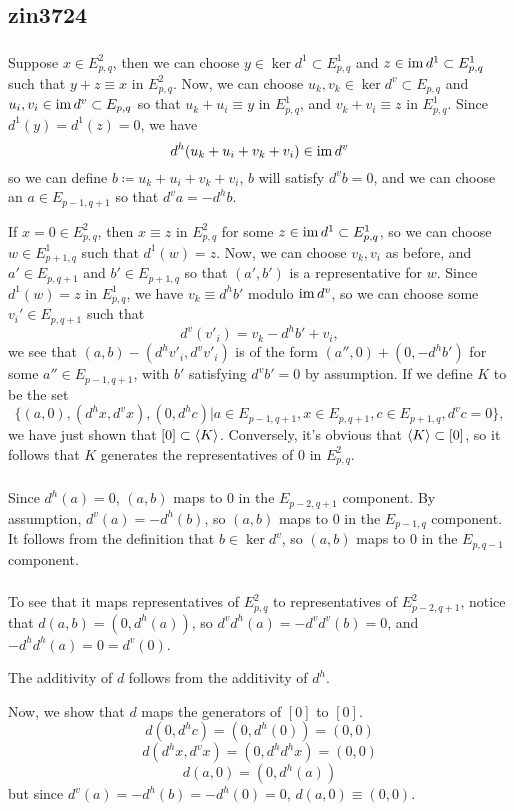 \subsection{zin3724}
\subsubsection{}
Suppose $x\in E^2_{p,q}$, then we can choose $y\in\ker d^1\subset E^1_{p,q}$ and $z\in\operatorname{\operatorname{im}} d^1\subset E^1_{p,q}$ such that $y+z\equiv x$ in $E^2_{p,q}$. Now, we can choose $u_k,v_k\in\ker d^v\subset E_{p,q}$ and $u_i,v_i\in\operatorname{\operatorname{im}} d^v\subset E_{p,q}$ so that $u_k+u_i\equiv y$ in $E^1_{p,q}$, and $v_k+v_i\equiv z$ in $E^1_{p,q}$. Since $d^1(y)=d^1(z)=0$, we have
\[d^h(u_k+u_i+v_k+v_i)\in\operatorname{\operatorname{im}} d^v\]
so we can define $b\coloneqq u_k+u_i+v_k+v_i$, $b$ will satisfy $d^vb=0$, and we can choose an $a\in E_{p-1,q+1}$ so that $d^va=-d^hb$.

If $x=0\in E^2_{p,q}$, then $x\equiv z$ in $E^2_{p,q}$ for some $z\in\operatorname{\operatorname{im}} d^1\subset E^1_{p,q}$, so we can choose $w\in E^1_{p+1,q}$ such that $d^1(w)=z$. Now, we can choose $v_k,v_i$ as before, and $a'\in E_{p,q+1}$ and $b'\in E_{p+1,q}$ so that $(a',b')$ is a representative for $w$. Since $d^1(w)=z$ in $E^1_{p,q}$, we have $v_k\equiv d^hb'$ modulo $\operatorname{\operatorname{im}} d^v$, so we can choose some $v_i'\in E_{p,q+1}$ such that
\[d^v(v'_i)=v_k-d^hb'+v_i,\]
we see that $(a,b)-(d^hv'_i,d^vv'_i)$ is of the form $(a'',0)+(0,-d^hb')$ for some $a''\in E_{p-1,q+1}$, with $b'$ satisfying $d^vb'=0$ by assumption. If we define $K$ to be the set
\[\{(a,0),(d^hx,d^vx),(0,d^hc)| a\in E_{p-1,q+1}, x\in E_{p,q+1}, c\in E_{p+1,q}, d^vc=0\},\]
we have just shown that $[0]\subset \langle K\rangle$. Conversely, it's obvious that $\langle K\rangle\subset[0]$, so it follows that $K$ generates the representatives of $0$ in $E^2_{p,q}$.
\subsubsection{}
Since $d^h(a)=0$, $(a,b)$ maps to $0$ in the $E_{p-2,q+1}$ component. By assumption, $d^v(a)=-d^h(b)$, so $(a,b)$ maps to $0$ in the $E_{p-1,q}$ component. It follows from the definition that $b\in\ker d^v$, so $(a,b)$ maps to $0$ in the $E_{p,q-1}$ component.
\subsubsection{}
To see that it maps representatives of $E^2_{p,q}$ to representatives of $E^2_{p-2,q+1}$, notice that $d(a,b)=(0,d^h(a))$, so $d^vd^h(a)=-d^vd^v(b)=0$, and $-d^hd^h(a)=0=d^v(0)$.

The additivity of $d$ follows from the additivity of $d^h$.

Now, we show that $d$ maps the generators of $[0]$ to $[0]$.
\[d(0,d^hc)=(0,d^h(0))=(0,0)\]
\[d(d^hx,d^vx)=(0,d^hd^hx)=(0,0)\]
\[d(a,0)=(0,d^h(a))\]
but since $d^v(a)=-d^h(b)=-d^h(0)=0$, $d(a,0)\equiv(0,0)$.